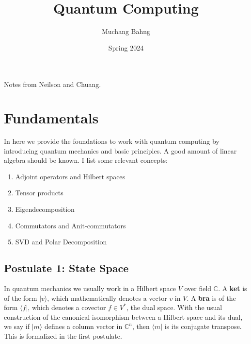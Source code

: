 \documentclass{article}
\theoremstyle{definition}
\begin{document}
\pagestyle{fancy}

\cfoot{\thepage / \pageref{LastPage}}

\title{Quantum Computing}
\author{Muchang Bahng}
\date{Spring 2024}

\maketitle
\tableofcontents
\pagebreak 

Notes from Neilson and Chuang.

\section{Fundamentals}

  In here we provide the foundations to work with quantum computing by introducing quantum mechanics and basic principles. A good amount of linear algebra should be known. I list some relevant concepts: 
  
  \begin{enumerate}
    \item Adjoint operators and Hilbert spaces 
    \item Tensor products
    \item Eigendecomposition 
    \item Commutators and Anit-commutators 
    \item SVD and Polar Decomposition 
  \end{enumerate}

  \subsection{Postulate 1: State Space}

    In quantum mechanics we usually work in a Hilbert space $V$ over field $\mathbb{C}$. A \textbf{ket} is of the form $| v \rangle$, which mathematically denotes a vector $v$ in $V$. A \textbf{bra} is of the form $\langle f |$, which denotes a covector $f \in V^\ast$, the dual space. With the usual construction of the canonical isomorphism between a Hilbert space and its dual, we say if $| m \rangle$ defines a column vector in $\mathbb{C}^n$, then $\langle m |$ is its conjugate transpose. This is formalized in the first postulate. 
\end{document}
